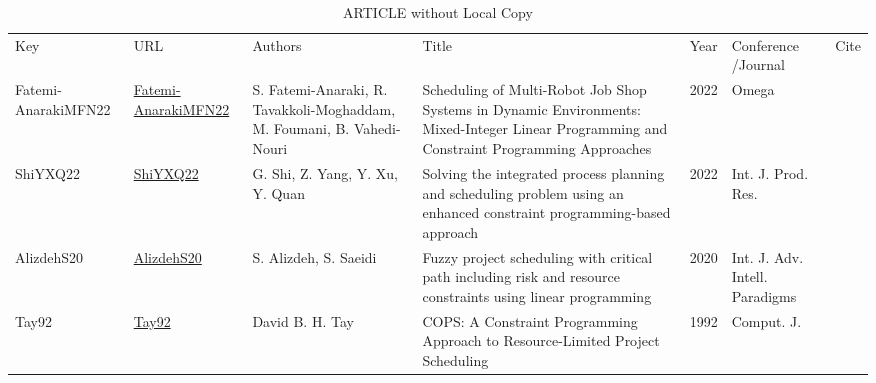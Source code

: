 {\scriptsize
\begin{longtable}{llp{5cm}p{10cm}rp{3cm}l}
\rowcolor{white}\caption{ARTICLE without Local Copy}\\ \toprule
\rowcolor{white}Key & URL & Authors & Title & Year & \shortstack{Conference\\/Journal} & Cite\\ \midrule
\endhead
\bottomrule
\endfoot
Fatemi-AnarakiMFN22 & \href{https://api.semanticscholar.org/CorpusID:252524295}{Fatemi-AnarakiMFN22} & S. Fatemi-Anaraki, R. Tavakkoli-Moghaddam, M. Foumani, B. Vahedi-Nouri & Scheduling of Multi-Robot Job Shop Systems in Dynamic Environments: Mixed-Integer Linear Programming and Constraint Programming Approaches & 2022 & Omega & \cite{Fatemi-AnarakiMFN22}\\ShiYXQ22 & \href{https://doi.org/10.1080/00207543.2021.1963496}{ShiYXQ22} & G. Shi, Z. Yang, Y. Xu, Y. Quan & Solving the integrated process planning and scheduling problem using an enhanced constraint programming-based approach & 2022 & Int. J. Prod. Res. & \cite{ShiYXQ22}\\AlizdehS20 & \href{https://doi.org/10.1504/IJAIP.2020.106687}{AlizdehS20} & S. Alizdeh, S. Saeidi & Fuzzy project scheduling with critical path including risk and resource constraints using linear programming & 2020 & Int. J. Adv. Intell. Paradigms & \cite{AlizdehS20}\\Tay92 & \href{}{Tay92} & David B. H. Tay & {COPS:} {A} Constraint Programming Approach to Resource-Limited Project Scheduling & 1992 & Comput. J. & \cite{Tay92}\\\end{longtable}
}

